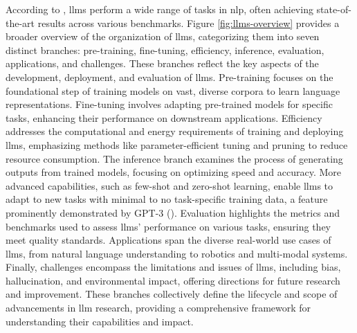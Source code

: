 According to \cite{Chang2024}, \glspl{llm} perform a wide range of tasks in \gls{nlp}, often achieving state-of-the-art results across various benchmarks.
Figure \ref{fig:llms-overview} provides a broader overview of the organization of \glspl{llm}, categorizing them into seven distinct branches: pre-training, fine-tuning, efficiency, inference, evaluation, applications, and challenges.
These branches reflect the key aspects of the development, deployment, and evaluation of \glspl{llm}.
Pre-training focuses on the foundational step of training models on vast, diverse corpora to learn language representations.
Fine-tuning involves adapting pre-trained models for specific tasks, enhancing their performance on downstream applications.
Efficiency addresses the computational and energy requirements of training and deploying \glspl{llm}, emphasizing methods like parameter-efficient tuning and pruning to reduce resource consumption.
The inference branch examines the process of generating outputs from trained models, focusing on optimizing speed and accuracy.
More advanced capabilities, such as few-shot and zero-shot learning, enable \glspl{llm} to adapt to new tasks with minimal to no task-specific training data, a feature prominently demonstrated by GPT-3 (\cite{NEURIPS2020_1457c0d6}).
Evaluation highlights the metrics and benchmarks used to assess \glspl{llm}' performance on various tasks, ensuring they meet quality standards.
Applications span the diverse real-world use cases of \glspl{llm}, from natural language understanding to robotics and multi-modal systems.
Finally, challenges encompass the limitations and issues of \glspl{llm}, including bias, hallucination, and environmental impact, offering directions for future research and improvement.
These branches collectively define the lifecycle and scope of advancements in \gls{llm} research, providing a comprehensive framework for understanding their capabilities and impact.

